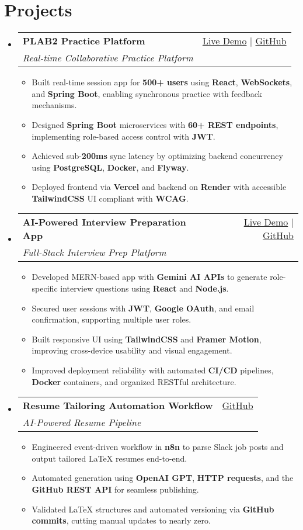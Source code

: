 \documentclass[letterpaper,11pt]{article}
\makeatletter
\newcommand{\resumeItem}[1]{\item\small{#1 \vspace{-2pt}}}
\newcommand{\resumeSubheading}[4]{
  \vspace{-1pt}\item
    \begin{tabular*}{0.97\textwidth}[t]{l@{\extracolsep{\fill}}r}
      \textbf{#1} & #2 \\
      \textit{\small#3} & \textit{\small #4} \\
    \end{tabular*}\vspace{-5pt}
}
\newcommand{\resumeSubHeadingListStart}{\begin{itemize}[leftmargin=*]}
\newcommand{\resumeSubHeadingListEnd}{\end{itemize}}
\newcommand{\resumeItemListStart}{\begin{itemize}}
\newcommand{\resumeItemListEnd}{\end{itemize}\vspace{-5pt}}
\makeatother
\begin{document}
\section{Projects}
  \resumeSubHeadingListStart
    \resumeSubheading
      {\textbf{PLAB2 Practice Platform}}{\href{https://plab2practice.com}{Live Demo} | \href{https://github.com/altansaid/plab2projectnew}{GitHub}}
      {Real-time Collaborative Practice Platform}{}
      \resumeItemListStart
        \resumeItem{Built real-time session app for \textbf{500+ users} using \textbf{React}, \textbf{WebSockets}, and \textbf{Spring Boot}, enabling synchronous practice with feedback mechanisms.}
        \resumeItem{Designed \textbf{Spring Boot} microservices with \textbf{60+ REST endpoints}, implementing role-based access control with \textbf{JWT}.}
        \resumeItem{Achieved sub-\textbf{200ms} sync latency by optimizing backend concurrency using \textbf{PostgreSQL}, \textbf{Docker}, and \textbf{Flyway}.}
        \resumeItem{Deployed frontend via \textbf{Vercel} and backend on \textbf{Render} with accessible \textbf{TailwindCSS} UI compliant with \textbf{WCAG}.}
      \resumeItemListEnd

    \resumeSubheading
      {\textbf{AI-Powered Interview Preparation App}}{\href{https://interviewcoach-ai.vercel.app}{Live Demo} | \href{https://github.com/altansaid/interviewcoach-ai}{GitHub}}
      {Full-Stack Interview Prep Platform}{}
      \resumeItemListStart
        \resumeItem{Developed MERN-based app with \textbf{Gemini AI APIs} to generate role-specific interview questions using \textbf{React} and \textbf{Node.js}.}
        \resumeItem{Secured user sessions with \textbf{JWT}, \textbf{Google OAuth}, and email confirmation, supporting multiple user roles.}
        \resumeItem{Built responsive UI using \textbf{TailwindCSS} and \textbf{Framer Motion}, improving cross-device usability and visual engagement.}
        \resumeItem{Improved deployment reliability with automated \textbf{CI/CD} pipelines, \textbf{Docker} containers, and organized RESTful architecture.}
      \resumeItemListEnd

    \resumeSubheading
      {\textbf{Resume Tailoring Automation Workflow}}{\href{https://github.com/altansaid/resume-updates}{GitHub}}{AI-Powered Resume Pipeline}{}
      \resumeItemListStart
        \resumeItem{Engineered event-driven workflow in \textbf{n8n} to parse Slack job posts and output tailored LaTeX resumes end-to-end.}
        \resumeItem{Automated generation using \textbf{OpenAI GPT}, \textbf{HTTP requests}, and the \textbf{GitHub REST API} for seamless publishing.}
        \resumeItem{Validated LaTeX structures and automated versioning via \textbf{GitHub commits}, cutting manual updates to nearly zero.}
      \resumeItemListEnd
  \resumeSubHeadingListEnd
\end{document}
